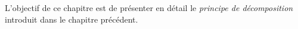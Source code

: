 L'objectif de ce chapitre est de présenter en détail le \emph{principe
  de décomposition} introduit dans le chapitre précédent.
